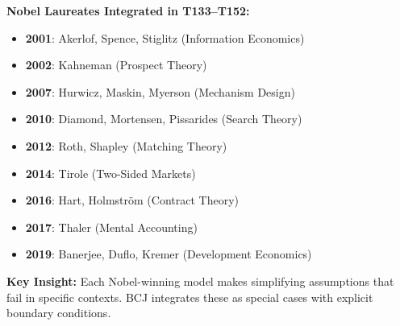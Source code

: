 \begin{tcolorbox}[colback=cyan!5!white, colframe=cyan!75!black,
    title=Nobel Integration: Economics Models with Boundary Conditions]
\textbf{Nobel Laureates Integrated in T133--T152:}
\begin{itemize}[nosep]
\item \textbf{2001}: Akerlof, Spence, Stiglitz (Information Economics)
\item \textbf{2002}: Kahneman (Prospect Theory)
\item \textbf{2007}: Hurwicz, Maskin, Myerson (Mechanism Design)
\item \textbf{2010}: Diamond, Mortensen, Pissarides (Search Theory)
\item \textbf{2012}: Roth, Shapley (Matching Theory)
\item \textbf{2014}: Tirole (Two-Sided Markets)
\item \textbf{2016}: Hart, Holmström (Contract Theory)
\item \textbf{2017}: Thaler (Mental Accounting)
\item \textbf{2019}: Banerjee, Duflo, Kremer (Development Economics)
\end{itemize}

\textbf{Key Insight:} Each Nobel-winning model makes simplifying assumptions that fail in specific contexts. BCJ integrates these as special cases with explicit boundary conditions.
\end{tcolorbox}

